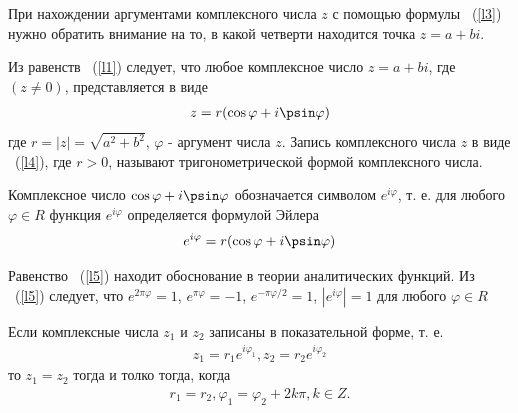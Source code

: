 \documentclass[14pt]{extreport}
\begin{document}
При нахождении аргументами комплексного числа $z$ с помощью формулы ~(\ref{l3}) нужно обратить внимание на то, в какой четверти находится точка  $z=a+bi$.

Из равенств ~(\ref{l1}) следует, что любое комплексное число $z=a+bi$, где $(z\neq0)$, представляется в виде
\begin{eqnarray}
 z = r(\cos\varphi + i\psin\varphi)
 \label{l4}
\end{eqnarray}
где $r=|z| = \sqrt{a^2+b^2}$, $\varphi$ - аргумент числа $z$. Запись комплексного числа $z$ в виде ~(\ref{l4}), где $r>0$, называют тригонометрической формой комплексного числа.

Комплексное число $\cos\varphi + i\psin\varphi$ обозначается символом $e^{i\varphi}$, т. е. для любого $\varphi \in R$ функция $e^{i\varphi}$ определяется формулой Эйлера
\begin{eqnarray}
 e^{i\varphi} = r(\cos\varphi + i\psin\varphi)
 \label{l5}
\end{eqnarray}

Равенство ~(\ref{l5}) находит обоснование в теории аналитических функций. Из ~(\ref{l5}) следует, что $e^{2\pi\varphi} = 1$, $e^{\pi\varphi} = -1$, $e^{-\pi\varphi/2} = 1$, $|e^{i\varphi}| = 1$ для  любого $\varphi \in R$

Если комплексные числа $z_1$ и $z_2$ записаны в показательной форме, т. е.
\begin{eqnarray*}
z_1 = r_1e^{i\varphi_1},  z_2 = r_2e^{i\varphi_2}
\end{eqnarray*}
то $z_1 = z_2$ тогда и толко тогда, когда
\begin{eqnarray*}
r_1 = r_2,  \varphi_1 = \varphi_2 + 2k\pi, k \in Z.
\end{eqnarray*}
\end{document}
